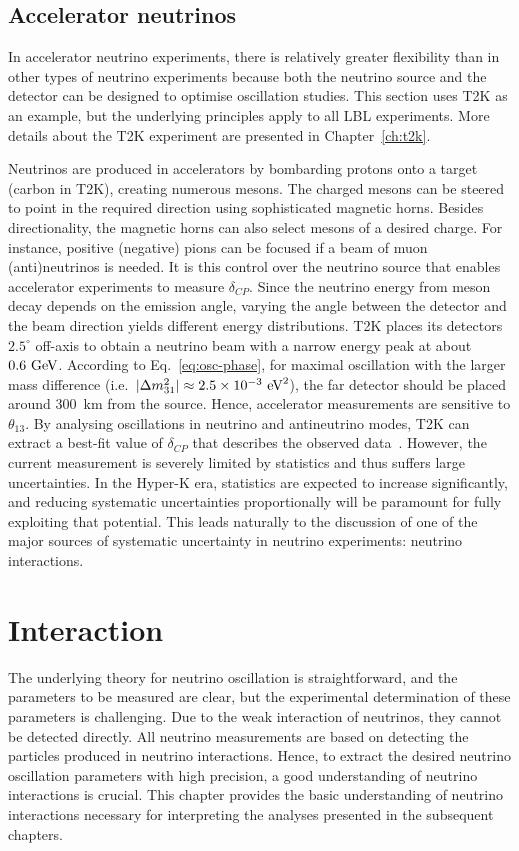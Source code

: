 \subsection{Accelerator neutrinos}
In accelerator neutrino experiments, there is relatively greater flexibility than in other types of neutrino experiments because both the neutrino source and the detector can be designed to optimise oscillation studies.
This section uses T2K as an example, but the underlying principles apply to all LBL experiments.
More details about the T2K experiment are presented in Chapter~\ref{ch:t2k}.

Neutrinos are produced in accelerators by bombarding protons onto a target (carbon in T2K), creating numerous mesons.
The charged mesons can be steered to point in the required direction using sophisticated magnetic horns.
Besides directionality, the magnetic horns can also select mesons of a desired charge.
For instance, positive (negative) pions can be focused if a beam of muon (anti)neutrinos is needed.
It is this control over the neutrino source that enables accelerator experiments to measure $\delta_{CP}$.
Since the neutrino energy from meson decay depends on the emission angle, varying the angle between the detector and the beam direction yields different energy distributions.
T2K places its detectors $2.5^\circ$ off-axis to obtain a neutrino beam with a narrow energy peak at about $0.6~\textrm{GeV}$.
According to Eq.~\ref{eq:osc-phase}, for maximal oscillation with the larger mass difference (i.e.\ $|\Delta m^2_{31}| \approx 2.5 \times 10^{-3}~\textrm{eV}^2$), the far detector should be placed around $300$~km from the source.
Hence, accelerator measurements are sensitive to $\theta_{13}$.
By analysing oscillations in neutrino and antineutrino modes, T2K can extract a best-fit value of $\delta_{CP}$ that describes the observed data~\cite{T2K:2019bcf}.
However, the current measurement is severely limited by statistics and thus suffers large uncertainties.
In the Hyper-K era, statistics are expected to increase significantly, and reducing systematic uncertainties proportionally will be paramount for fully exploiting that potential.
This leads naturally to the discussion of one of the major sources of systematic uncertainty in neutrino experiments: neutrino interactions.

\section{Interaction}
\label{sec:interaction}
The underlying theory for neutrino oscillation is straightforward, and the parameters to be measured are clear, but the experimental determination of these parameters is challenging.
Due to the weak interaction of neutrinos, they cannot be detected directly.
All neutrino measurements are based on detecting the particles produced in neutrino interactions.
Hence, to extract the desired neutrino oscillation parameters with high precision, a good understanding of neutrino interactions is crucial.
This chapter provides the basic understanding of neutrino interactions necessary for interpreting the analyses presented in the subsequent chapters.

